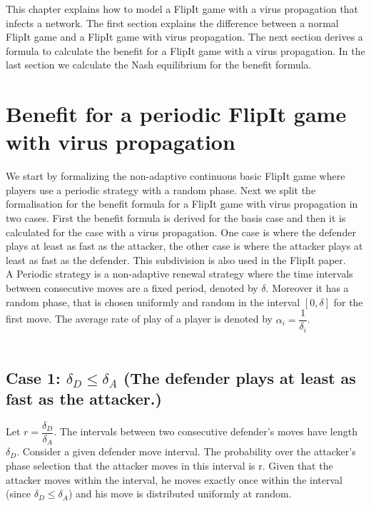 This chapter explains how to model a FlipIt game with a virus propagation that infects a network. The first section explains the difference between a normal FlipIt game and a FlipIt game with virus propagation. The next section derives a formula to calculate the benefit for a FlipIt game with a virus propagation. In the last section we calculate the Nash equilibrium for the benefit formula.




\section{Benefit for a periodic FlipIt game with virus propagation}
We start by formalizing the non-adaptive continuous basic FlipIt game where players use a periodic strategy with a random phase. Next we split the formalisation for the benefit formula for a FlipIt game with virus propagation in two cases. First the benefit formula is derived for the basis case and then it is calculated for the case with a virus propagation. One case is where the defender plays at least as fast as the attacker, the other case is where the attacker plays at least as fast as the defender. This subdivision is also used in the FlipIt paper. \\

 A Periodic strategy is a non-adaptive renewal strategy where the time intervals between consecutive moves are a fixed period, denoted by $\delta$. Moreover it has a random phase, that is chosen uniformly and random in the interval $[0,\delta]$ for the first move. The average rate of play of a player is denoted by $\alpha_{i} = \dfrac{1}{\delta_{i}}$. \\
~~\\


\subsection*{\textbf{Case 1:} $\delta_{D} \leq \delta_{A} $ (The defender plays at least as fast as the attacker.) }

Let $r = \dfrac{\delta_{D}}{ \delta_{A} }$. The intervals between two consecutive defender's moves have length $\delta_{D}$. Consider a given defender move interval. The probability over the attacker's phase selection that the attacker moves in this interval is r. Given that the attacker moves within the interval, he moves exactly once within the interval (since $\delta_{D} \leq \delta_{A} $) and his move is distributed uniformly at random. \\

